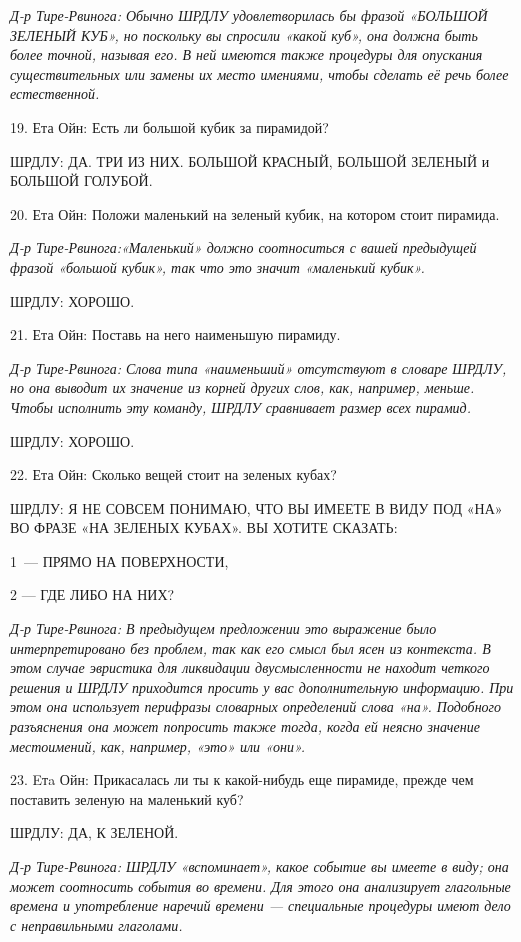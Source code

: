 \documentclass[../main.tex]{subfiles}
\begin{document}
\begin{dialogue}
\emph{Д-р Тире-Рвинога: Обычно ШРДЛУ удовлетворилась бы фразой «БОЛЬШОЙ ЗЕЛЕНЫЙ КУБ», но поскольку вы спросили «какой куб», она должна быть более точной, называя его. В ней имеются также процедуры для опускания существительных или замены их место имениями, чтобы сделать её речь более естественной.}

19. Ета Ойн: Есть ли большой кубик за пирамидой?

ШРДЛУ: ДА. ТРИ ИЗ НИХ. БОЛЬШОЙ КРАСНЫЙ, БОЛЬШОЙ ЗЕЛЕНЫЙ и БОЛЬШОЙ ГОЛУБОЙ.

20. Ета Ойн: Положи маленький на зеленый кубик, на котором стоит пирамида.

\emph{Д-р Тире-Рвинога:«Маленький» должно соотноситься с вашей предыдущей фразой «большой кубик», так что это значит «маленький кубик».}

ШРДЛУ: ХОРОШО.

21. Ета Ойн: Поставь на него наименьшую пирамиду.

\emph{Д-р Тире-Рвинога: Слова типа «наименьший» отсутствуют в словаре ШРДЛУ, но она выводит их значение из корней других слов, как, например, меньше. Чтобы исполнить эту команду, ШРДЛУ сравнивает размер всех пирамид.}

ШРДЛУ: ХОРОШО.

22. Ета Ойн: Сколько вещей стоит на зеленых кубах?

ШРДЛУ: Я НЕ СОВСЕМ ПОНИМАЮ, ЧТО ВЫ ИМЕЕТЕ В ВИДУ ПОД «НА» ВО ФРАЗЕ «НА ЗЕЛЕНЫХ КУБАХ». ВЫ ХОТИТЕ СКАЗАТЬ:

1~--- ПРЯМО НА ПОВЕРХНОСТИ,

2 --- ГДЕ ЛИБО НА НИХ?

\emph{Д-р Тире-Рвинога: В предыдущем предложении это выражение было интерпретировано без проблем, так как его смысл был ясен из контекста. В этом случае эвристика для ликвидации двусмысленности не находит четкого решения и ШРДЛУ приходится просить у вас дополнительную информацию. При этом она использует перифразы словарных определений слова «на». Подобного разъяснения она может попросить также тогда, когда ей неясно значение местоимений, как, например, «это» или «они».}

23. Eтa Ойн: Прикасалась ли ты к какой-нибудь еще пирамиде, прежде чем поставить зеленую на маленький куб?

ШРДЛУ: ДА, К ЗЕЛЕНОЙ.

\emph{Д-р Тире-Рвинога: ШРДЛУ «вспоминает», какое событие вы имеете в виду; она может соотносить события во времени. Для этого она анализирует глагольные времена и употребление наречий времени --- специальные процедуры имеют дело с неправильными глаголами.}


\end{dialogue}
\end{document}

